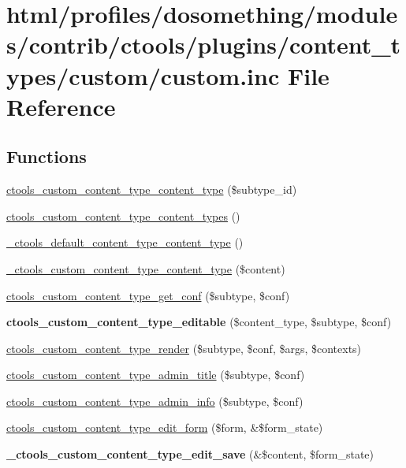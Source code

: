 \hypertarget{custom_8inc}{
\section{html/profiles/dosomething/modules/contrib/ctools/plugins/content\_\-types/custom/custom.inc File Reference}
\label{custom_8inc}
}
\subsection*{Functions}
\begin{DoxyCompactItemize}
\item 
\hyperlink{custom_8inc_a4ddbda30a8235191fa739a18a3bc42c0}{ctools\_\-custom\_\-content\_\-type\_\-content\_\-type} (\$subtype\_\-id)
\item 
\hyperlink{custom_8inc_a111ca5230b3530b710edb9b22f44ecaf}{ctools\_\-custom\_\-content\_\-type\_\-content\_\-types} ()
\item 
\hyperlink{custom_8inc_a8f3961a55c9aa29f6da0ac7febfc6451}{\_\-ctools\_\-default\_\-content\_\-type\_\-content\_\-type} ()
\item 
\hyperlink{custom_8inc_a7ff302d633e91a61dde504e1f3a65882}{\_\-ctools\_\-custom\_\-content\_\-type\_\-content\_\-type} (\$content)
\item 
\hyperlink{custom_8inc_ae59d8ddc790a2cf617a5258605558afe}{ctools\_\-custom\_\-content\_\-type\_\-get\_\-conf} (\$subtype, \$conf)
\item 
\hypertarget{custom_8inc_a9ca08147619cd10be48d6db4ddee9ab4}{
{\bfseries ctools\_\-custom\_\-content\_\-type\_\-editable} (\$content\_\-type, \$subtype, \$conf)}
\label{custom_8inc_a9ca08147619cd10be48d6db4ddee9ab4}

\item 
\hyperlink{custom_8inc_ac0fef2187c02bdc6637f6dc04aebba7e}{ctools\_\-custom\_\-content\_\-type\_\-render} (\$subtype, \$conf, \$args, \$contexts)
\item 
\hyperlink{custom_8inc_a986db525d75c5d19f7ad05859cd1f51b}{ctools\_\-custom\_\-content\_\-type\_\-admin\_\-title} (\$subtype, \$conf)
\item 
\hyperlink{custom_8inc_a8c8379863987f4dcdcc64ad245dca7fb}{ctools\_\-custom\_\-content\_\-type\_\-admin\_\-info} (\$subtype, \$conf)
\item 
\hyperlink{custom_8inc_a4a0252b57ca4e1c004d40f421749f3ad}{ctools\_\-custom\_\-content\_\-type\_\-edit\_\-form} (\$form, \&\$form\_\-state)
\item 
\hypertarget{custom_8inc_acb08e833d135e37a6dd01ed47b26834e}{
{\bfseries \_\-ctools\_\-custom\_\-content\_\-type\_\-edit\_\-save} (\&\$content, \$form\_\-state)}
\label{custom_8inc_acb08e833d135e37a6dd01ed47b26834e}


\end{DoxyCompactItemize}
